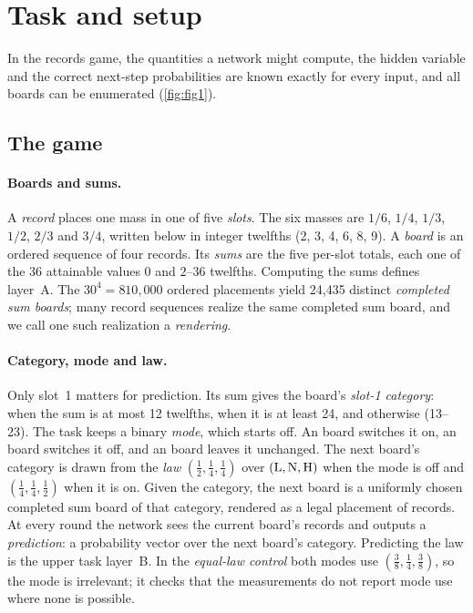 \section{Task and setup}\label{sec:task}



In the records game, the quantities a network might compute, the hidden
variable and the correct next-step probabilities are known exactly for every
input, and all boards can be enumerated (\cref{fig:fig1}).

\subsection{The game}\label{sec:game}

\paragraph{Boards and sums.} A \emph{record} places one mass in one of five
\emph{slots}. The six masses are $1/6$, $1/4$, $1/3$, $1/2$, $2/3$ and $3/4$,
written below in integer twelfths (2, 3, 4, 6, 8, 9). A \emph{board} is an
ordered sequence of four records. Its \emph{sums} are the five per-slot
totals, each one of the 36 attainable values $0$ and $2$--$36$ twelfths.
Computing the sums defines layer~A. The $30^4 = 810{,}000$ ordered placements
yield 24,435 distinct \emph{completed sum boards}; many record sequences
realize the same completed sum board, and we call one such realization a
\emph{rendering}.

\paragraph{Category, mode and law.} Only slot~1 matters for prediction. Its
sum gives the board's \emph{slot-1 category}: \Lcat{} when the sum is at most
12 twelfths, \Hcat{} when it is at least 24, and \Ncat{} otherwise (13--23).
The task keeps a binary \emph{mode}, which starts off. An \Hcat{} board
switches it on, an \Lcat{} board switches it off, and an \Ncat{} board leaves
it unchanged. The next board's category is drawn from the \emph{law}
$(\tfrac12, \tfrac14, \tfrac14)$ over $(\mathrm{L}, \mathrm{N}, \mathrm{H})$ when the mode
is off and $(\tfrac14, \tfrac14, \tfrac12)$ when it is on. Given the
category, the next board is a uniformly chosen completed sum board of that
category, rendered as a legal placement of records. At every round the
network sees the current board's records and outputs a \emph{prediction}: a
probability vector over the next board's category. Predicting the law is the
upper task layer~B. In the \emph{equal-law control} both modes use
$(\tfrac38, \tfrac14, \tfrac38)$, so the mode is irrelevant; it checks that
the measurements do not report mode use where none is possible.

